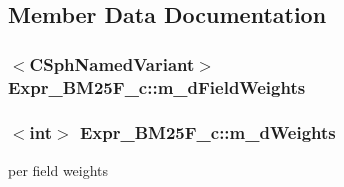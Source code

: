 \subsection{Member Data Documentation}
\hypertarget{structExpr__BM25F__c_a537d133dd52798edfae58852ad3e40de}{
\subsubsection[{m\-\_\-d\-Field\-Weights}]{$<${\bf C\-Sph\-Named\-Variant}$>$ Expr\-\_\-\-B\-M25\-F\-\_\-c\-::m\-\_\-d\-Field\-Weights}}\label{structExpr__BM25F__c_a537d133dd52798edfae58852ad3e40de}
\hypertarget{structExpr__BM25F__c_a280ea1ac07c64505dc7c048d3a518d40}{
\subsubsection[{m\-\_\-d\-Weights}]{$<${\bf int}$>$ Expr\-\_\-\-B\-M25\-F\-\_\-c\-::m\-\_\-d\-Weights}}\label{structExpr__BM25F__c_a280ea1ac07c64505dc7c048d3a518d40}


per field weights 


